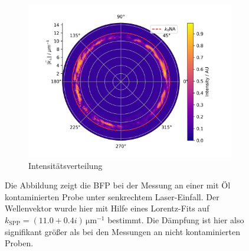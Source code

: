 \documentclass[titlepage,  ngerman]{article}
\begin{document}
\begin{figure}[h!]
		\begin{subfigure}[b]{0.7\textwidth}
		\centering
		\includegraphics[width=\textwidth]{figures/dirt_polar.png}
		\caption{Intensitätsverteilung}
		\label{fig:dirt_polar}
		\end{subfigure}
		\caption[Messung an kontaminierter Probe]{Die Abbildung zeigt die BFP bei der Messung an einer mit Öl kontaminierten Probe unter senkrechtem Laser-Einfall. Der Wellenvektor wurde hier mit Hilfe eines Lorentz-Fits auf $k_\mathrm{SPP} = (11.0 + 0.4i)\,\mathrm{\mu m}^{-1}$ bestimmt. Die Dämpfung ist hier also signifikant größer als bei den Messungen an nicht kontaminierten Proben.}			
	\end{figure}
\end{document}
